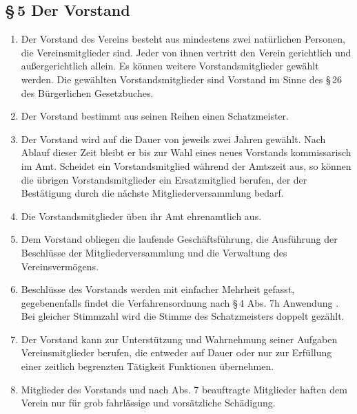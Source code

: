 \documentclass[12pt,a4paper]{article}
\begin{document}
\subsection*{§\,5 Der Vorstand}
\begin{enumerate}
\item Der Vorstand des Vereins besteht aus mindestens zwei natürlichen Personen, die Vereinsmitglieder sind. Jeder von ihnen vertritt den Verein gerichtlich und außergerichtlich allein. Es können weitere Vorstandsmitglieder gewählt werden. Die gewählten Vorstandsmitglieder sind Vorstand im Sinne des §\,26 des Bürgerlichen Gesetzbuches.
\item Der Vorstand bestimmt aus seinen Reihen einen Schatzmeister.
\item Der Vorstand wird auf die Dauer von jeweils zwei Jahren gewählt. Nach Ablauf dieser Zeit bleibt er bis zur Wahl eines neues Vorstands kommissarisch im Amt. Scheidet ein Vorstandsmitglied während der Amtszeit aus, so können die übrigen Vorstandsmitglieder ein Ersatzmitglied berufen, der der Bestätigung durch die nächste Mitgliederversammlung bedarf.
\item Die Vorstandsmitglieder üben ihr Amt ehrenamtlich aus.
\item Dem Vorstand obliegen die laufende Geschäftsführung, die Ausführung der Beschlüsse der Mitgliederversammlung und die Verwaltung des Vereinsvermögens.
\item Beschlüsse des Vorstands werden mit einfacher Mehrheit gefasst, gegebenenfalls findet die Verfahrensordnung nach §\,4 Abs. 7h Anwendung . Bei gleicher Stimmzahl wird die Stimme des Schatzmeisters doppelt gezählt.
\item Der Vorstand kann zur Unterstützung und Wahrnehmung seiner Aufgaben Vereinsmitglieder berufen, die entweder auf Dauer oder nur zur Erfüllung einer zeitlich begrenzten Tätigkeit Funktionen übernehmen.
\item Mitglieder des Vorstands und nach Abs. 7 beauftragte Mitglieder haften dem Verein nur für grob fahrlässige und vorsätzliche Schädigung.
\end{enumerate}
\end{document}
